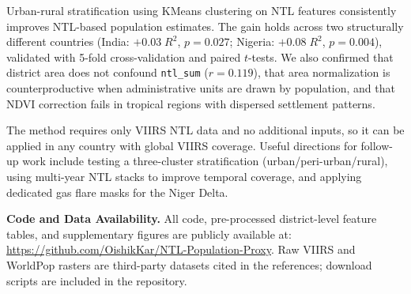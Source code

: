 \documentclass[conference]{IEEEtran}
\begin{document}
Urban-rural stratification using KMeans clustering on NTL features consistently improves NTL-based population estimates. The gain holds across two structurally different countries (India: $+0.03\;R^2$, $p{=}0.027$; Nigeria: $+0.08\;R^2$, $p{=}0.004$), validated with 5-fold cross-validation and paired $t$-tests. We also confirmed that district area does not confound \texttt{ntl\_sum} ($r{=}0.119$), that area normalization is counterproductive when administrative units are drawn by population, and that NDVI correction fails in tropical regions with dispersed settlement patterns.

The method requires only VIIRS NTL data and no additional inputs, so it can be applied in any country with global VIIRS coverage. Useful directions for follow-up work include testing a three-cluster stratification (urban/peri-urban/rural), using multi-year NTL stacks to improve temporal coverage, and applying dedicated gas flare masks for the Niger Delta.

\smallskip\noindent\textbf{Code and Data Availability.}
All code, pre-processed district-level feature tables, and supplementary figures are publicly available at:
\url{https://github.com/OishikKar/NTL-Population-Proxy}.
Raw VIIRS and WorldPop rasters are third-party datasets cited in the references; download scripts are included in the repository.
\end{document}
